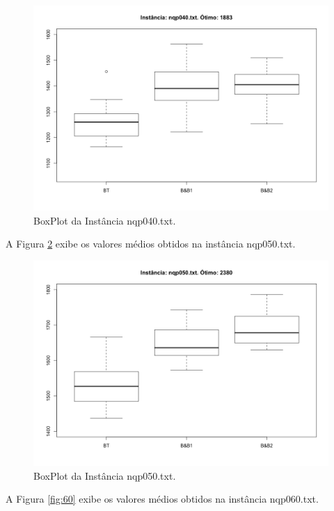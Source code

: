\documentclass[12pt]{article}
\begin{document}
	\begin{figure}[H]
		\centering
		\includegraphics[width=0.9\linewidth]{img/40}
		\caption{BoxPlot da Instância nqp040.txt.}
		\label{fig:40}
	\end{figure}

	A Figura \ref{fig:50} exibe os valores médios obtidos na instância nqp050.txt.

	\begin{figure}[H]
		\centering
		\includegraphics[width=0.9\linewidth]{img/50}
		\caption{BoxPlot da Instância nqp050.txt.}
		\label{fig:50}
	\end{figure}

	A Figura \ref{fig:60} exibe os valores médios obtidos na instância nqp060.txt.
\end{document}

